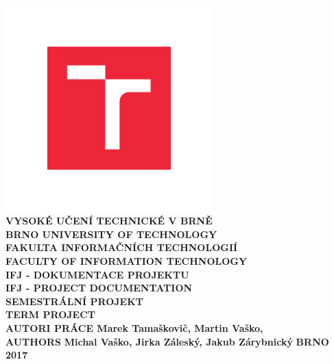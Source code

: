 \documentclass[12pt,a4paper]{report}
\begin{document}
\begin{titlepage}

\selectfont
\addtolength{\voffset}{-3cm}

\noindent\hspace{-60.0pt}\includegraphics[width=0.6\textwidth]{./img/VUT_symbol_barevne_CMYK_CZ}\\
\Large\textbf{VYSOKÉ UČENÍ TECHNICKÉ V BRNĚ}\\
\small\textbf{BRNO UNIVERSITY OF TECHNOLOGY}\\\vfill\hspace{-0.7cm}
\Large\textbf{FAKULTA INFORMAČNÍCH TECHNOLOGIÍ}\\
\small\textbf{FACULTY OF INFORMATION TECHNOLOGY}\\\vfill\hspace{-0.7cm}
\Large\textbf{IFJ - DOKUMENTACE PROJEKTU}\\
\small\textbf{IFJ - PROJECT DOCUMENTATION}\\\vfill\hspace{-0.7cm}
\Large\textbf{SEMESTRÁLNÍ PROJEKT}\\
\small\textbf{TERM PROJECT}\\\vfill\hspace{-0.7cm}
\Large\textbf{AUTORI PRÁCE \hfill \normalsize{Marek Tamaškovič, Martin Vaško,}}\\
\small\textbf{AUTHORS} \hfill \normalsize\textbf{Michal Vaško, Jirka Záleský, Jakub Zárybnický}
\vfill\hspace{-0.7cm}
\large\textbf{BRNO 2017}

\newpage
\fontfamily{\familydefault}\selectfont%
\end{titlepage}

\end{document}
